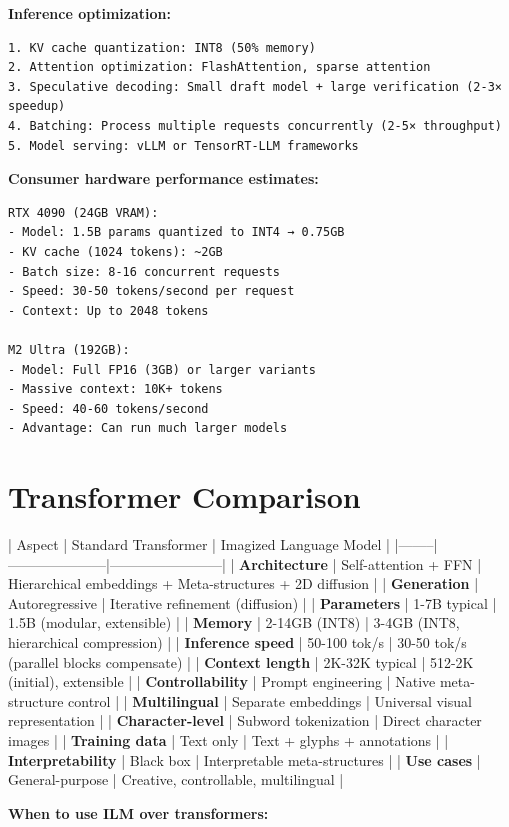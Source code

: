 \documentclass[11pt]{article}
\begin{document}
\textbf{Inference optimization:}

\begin{verbatim}
1. KV cache quantization: INT8 (50% memory)
2. Attention optimization: FlashAttention, sparse attention
3. Speculative decoding: Small draft model + large verification (2-3× speedup)
4. Batching: Process multiple requests concurrently (2-5× throughput)
5. Model serving: vLLM or TensorRT-LLM frameworks
\end{verbatim}

\textbf{Consumer hardware performance estimates:}

\begin{verbatim}
RTX 4090 (24GB VRAM):
- Model: 1.5B params quantized to INT4 → 0.75GB
- KV cache (1024 tokens): ~2GB
- Batch size: 8-16 concurrent requests
- Speed: 30-50 tokens/second per request
- Context: Up to 2048 tokens

M2 Ultra (192GB):
- Model: Full FP16 (3GB) or larger variants
- Massive context: 10K+ tokens
- Speed: 40-60 tokens/second
- Advantage: Can run much larger models
\end{verbatim}

\section{Transformer Comparison}

| Aspect | Standard Transformer | Imagized Language Model |
|--------|---------------------|------------------------|
| \textbf{Architecture} | Self-attention + FFN | Hierarchical embeddings + Meta-structures + 2D diffusion |
| \textbf{Generation} | Autoregressive | Iterative refinement (diffusion) |
| \textbf{Parameters} | 1-7B typical | 1.5B (modular, extensible) |
| \textbf{Memory} | 2-14GB (INT8) | 3-4GB (INT8, hierarchical compression) |
| \textbf{Inference speed} | 50-100 tok/s | 30-50 tok/s (parallel blocks compensate) |
| \textbf{Context length} | 2K-32K typical | 512-2K (initial), extensible |
| \textbf{Controllability} | Prompt engineering | Native meta-structure control |
| \textbf{Multilingual} | Separate embeddings | Universal visual representation |
| \textbf{Character-level} | Subword tokenization | Direct character images |
| \textbf{Training data} | Text only | Text + glyphs + annotations |
| \textbf{Interpretability} | Black box | Interpretable meta-structures |
| \textbf{Use cases} | General-purpose | Creative, controllable, multilingual |

\textbf{When to use ILM over transformers:}
\end{document}
